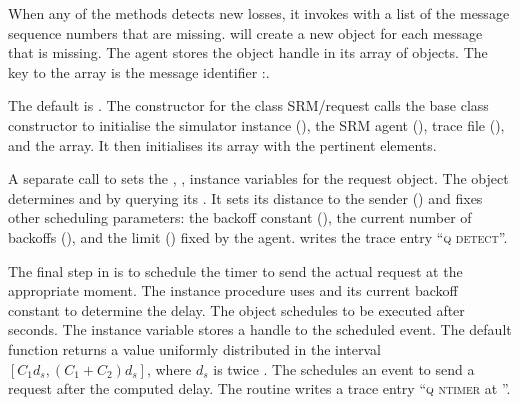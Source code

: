 {When any of the methods detects new losses, it invokes
with a list of the message sequence numbers that are missing.
 will create a new 
object for each message that is missing.
The agent stores the object handle in its array of  objects.
The key to the array is the message identifier :.
\begin{list}{}{}
\item 
  The default  is .
  The constructor for the class SRM/request
  calls the base class constructor to initialise 
  the simulator instance (), the SRM agent (),
  trace file (), and the  array.
  It then initialises its  array with the pertinent elements.

\item
  A separate call to
  sets the , ,  instance variables for
  the request object.
  The object determines  and  by querying its .
  It sets its distance to the sender ()
  and fixes other scheduling parameters:
  the backoff constant (),
  the current number of backoffs (),
  and the limit () fixed by the agent.
   writes the trace entry ``\textsc{q detect}''.

\item
  The final step in  is to schedule the timer
  to send the actual request at the appropriate moment.
  The instance procedure
  uses 
  and its current backoff constant to determine the delay.
  The object schedules
  to be executed after  seconds.
  The instance variable  stores a handle to the scheduled event.
  The default  function returns a value
  uniformly distributed in the interval $[C_1 d_s, (C_1 + C_2) d_s]$,
  where $d_s$ is twice .
  The  schedules an event to send a request
  after the computed delay. 
  The routine writes a trace entry ``\textsc{q ntimer } at ''.
\end{list}

}
